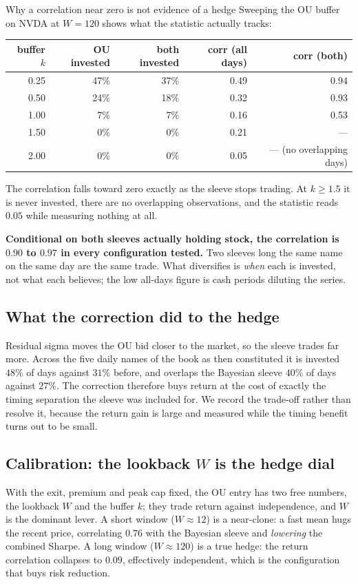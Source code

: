 \documentclass[11pt]{article}
\begin{document}
\begin{fixbox}{Why a correlation near zero is not evidence of a hedge}
Sweeping the OU buffer on NVDA at $W=120$ shows what the statistic actually tracks:

\begin{center}\small
\begin{tabular}{rrrrr}
\toprule
\textbf{buffer $k$} & \textbf{OU invested} & \textbf{both invested} & \textbf{corr (all days)} &
\textbf{corr (both)}\\
\midrule
0.25 & 47\% & 37\% & 0.49 & 0.94\\
0.50 & 24\% & 18\% & 0.32 & 0.93\\
1.00 & 7\%  & 7\%  & 0.16 & 0.53\\
1.50 & 0\%  & 0\%  & 0.21 & ---\\
2.00 & 0\%  & 0\%  & 0.05 & --- (no overlapping days)\\
\bottomrule
\end{tabular}
\end{center}

The correlation falls toward zero exactly as the sleeve stops trading. At $k\ge1.5$ it is never
invested, there are no overlapping observations, and the statistic reads $0.05$ while measuring
nothing at all.

\textbf{Conditional on both sleeves actually holding stock, the correlation is $0.90$ to $0.97$ in
every configuration tested.} Two sleeves long the same name on the same day are the same trade.
What diversifies is \emph{when} each is invested, not what each believes; the low all-days figure
is cash periods diluting the series.
\end{fixbox}

\subsection{What the correction did to the hedge}

Residual sigma moves the OU bid closer to the market, so the sleeve trades far more. Across the
five daily names of the book as then constituted it is invested $48\%$ of days against $31\%$ before, and overlaps the
Bayesian sleeve $40\%$ of days against $27\%$. The correction therefore buys return at the cost of
exactly the timing separation the sleeve was included for. We record the trade-off rather than
resolve it, because the return gain is large and measured while the timing benefit turns out to be
small.

\subsection{Calibration: the lookback $W$ is the hedge dial}
With the exit, premium and peak cap fixed, the OU entry has two free numbers, the lookback $W$
and the buffer $k$; they trade return against independence, and $W$ is the dominant lever. A
short window ($W\approx12$) is a near-clone: a fast mean hugs the recent price, correlating
$0.76$ with the Bayesian sleeve and \emph{lowering} the combined Sharpe. A long window
($W\approx120$) is a true hedge: the return correlation collapses to $0.09$, effectively
independent, which is the configuration that buys risk reduction.
\end{document}

